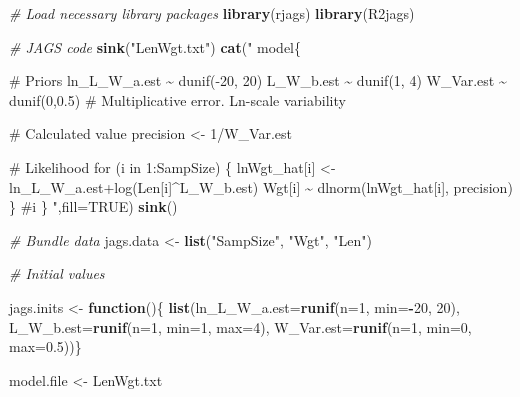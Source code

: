 \documentclass[
]{krantz}
\makeatletter
\newenvironment{Shaded}{\begin{snugshade}}{\end{snugshade}}
\newcommand{\AttributeTok}[1]{\textcolor[rgb]{0.27,0.27,0.27}{#1}}
\newcommand{\CommentTok}[1]{\textcolor[rgb]{0.37,0.37,0.37}{\textit{#1}}}
\newcommand{\ConstantTok}[1]{\textcolor[rgb]{0.37,0.37,0.37}{#1}}
\newcommand{\ControlFlowTok}[1]{\textcolor[rgb]{0.27,0.27,0.27}{\textbf{#1}}}
\newcommand{\DecValTok}[1]{\textcolor[rgb]{0.06,0.06,0.06}{#1}}
\newcommand{\FloatTok}[1]{\textcolor[rgb]{0.06,0.06,0.06}{#1}}
\newcommand{\FunctionTok}[1]{\textcolor[rgb]{0.27,0.27,0.27}{\textbf{#1}}}
\newcommand{\NormalTok}[1]{#1}
\newcommand{\OtherTok}[1]{\textcolor[rgb]{0.37,0.37,0.37}{#1}}
\newcommand{\SpecialCharTok}[1]{\textcolor[rgb]{0.43,0.43,0.43}{\textbf{#1}}}
\newcommand{\StringTok}[1]{\textcolor[rgb]{0.5,0.5,0.5}{#1}}
\newenvironment{kframe}{%
\medskip{}
\setlength{\fboxsep}{.8em}
 \def\at@end@of@kframe{}%
 \ifinner\ifhmode%
  \def\at@end@of@kframe{\end{minipage}}%
  \begin{minipage}{\columnwidth}%
 \fi\fi%
 \def\FrameCommand##1{\hskip\@totalleftmargin \hskip-\fboxsep
 \colorbox{shadecolor}{##1}\hskip-\fboxsep
     \hskip-\linewidth \hskip-\@totalleftmargin \hskip\columnwidth}%
 \MakeFramed {\advance\hsize-\width
   \@totalleftmargin\z@ \linewidth\hsize
   \@setminipage}}%
 {\par\unskip\endMakeFramed%
 \at@end@of@kframe}
\renewenvironment{Shaded}{\begin{kframe}}{\end{kframe}}
\makeatother
\begin{document}
\begin{Shaded}
\begin{Highlighting}[]
\CommentTok{\# Load necessary library packages}
\FunctionTok{library}\NormalTok{(rjags)}
\FunctionTok{library}\NormalTok{(R2jags)}

\CommentTok{\# JAGS code}
\FunctionTok{sink}\NormalTok{(}\StringTok{"LenWgt.txt"}\NormalTok{)}
\FunctionTok{cat}\NormalTok{(}\StringTok{"}
\StringTok{model\{}

\StringTok{\# Priors}
\StringTok{ ln\_L\_W\_a.est \textasciitilde{} dunif({-}20, 20)}
\StringTok{ L\_W\_b.est \textasciitilde{} dunif(1, 4)}
\StringTok{ W\_Var.est \textasciitilde{} dunif(0,0.5)   }
\StringTok{   \# Multiplicative error. Ln{-}scale variability}

\StringTok{\# Calculated value}
\StringTok{ precision \textless{}{-} 1/W\_Var.est}

\StringTok{\# Likelihood}
\StringTok{ for (i in 1:SampSize) \{}
\StringTok{    lnWgt\_hat[i] \textless{}{-} ln\_L\_W\_a.est+log(Len[i]\^{}L\_W\_b.est)}
\StringTok{    Wgt[i] \textasciitilde{} dlnorm(lnWgt\_hat[i], precision)}
\StringTok{ \} \#i}
\StringTok{\}}
\StringTok{    "}\NormalTok{,}\AttributeTok{fill=}\ConstantTok{TRUE}\NormalTok{)}
\FunctionTok{sink}\NormalTok{()}

\CommentTok{\# Bundle data}
\NormalTok{jags.data }\OtherTok{\textless{}{-}} \FunctionTok{list}\NormalTok{(}\StringTok{"SampSize"}\NormalTok{, }\StringTok{"Wgt"}\NormalTok{, }\StringTok{"Len"}\NormalTok{)}

\CommentTok{\# Initial values}

\NormalTok{jags.inits }\OtherTok{\textless{}{-}} \ControlFlowTok{function}\NormalTok{()\{ }\FunctionTok{list}\NormalTok{(}\AttributeTok{ln\_L\_W\_a.est=}\FunctionTok{runif}\NormalTok{(}\AttributeTok{n=}\DecValTok{1}\NormalTok{, }\AttributeTok{min=}\SpecialCharTok{{-}}\DecValTok{20}\NormalTok{, }\DecValTok{20}\NormalTok{),}
                               \AttributeTok{L\_W\_b.est=}\FunctionTok{runif}\NormalTok{(}\AttributeTok{n=}\DecValTok{1}\NormalTok{, }\AttributeTok{min=}\DecValTok{1}\NormalTok{, }\AttributeTok{max=}\DecValTok{4}\NormalTok{),}
                               \AttributeTok{W\_Var.est=}\FunctionTok{runif}\NormalTok{(}\AttributeTok{n=}\DecValTok{1}\NormalTok{, }\AttributeTok{min=}\DecValTok{0}\NormalTok{, }\AttributeTok{max=}\FloatTok{0.5}\NormalTok{))\}}

\NormalTok{model.file }\OtherTok{\textless{}{-}} \StringTok{\textquotesingle{}LenWgt.txt\textquotesingle{}}


\end{Highlighting}
\end{Shaded}
\end{document}
